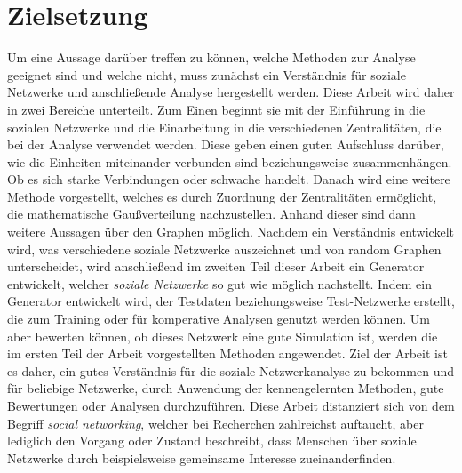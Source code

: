 \section{Zielsetzung}\label{sec:zielsetzung}
Um eine Aussage darüber treffen zu können, welche Methoden zur Analyse geeignet sind und welche nicht, muss zunächst ein Verständnis für soziale Netzwerke und anschließende Analyse hergestellt werden. Diese Arbeit wird daher in zwei Bereiche unterteilt. Zum Einen beginnt sie mit der Einführung in die sozialen Netzwerke und die Einarbeitung in die verschiedenen Zentralitäten, die bei der Analyse verwendet werden. Diese geben einen guten Aufschluss darüber, wie die Einheiten miteinander verbunden sind beziehungsweise zusammenhängen. Ob es sich starke Verbindungen oder schwache handelt. Danach wird eine weitere Methode vorgestellt, welches es durch Zuordnung der Zentralitäten ermöglicht, die mathematische Gaußverteilung nachzustellen. Anhand dieser sind dann weitere Aussagen über den Graphen möglich. Nachdem ein Verständnis entwickelt wird, was verschiedene soziale Netzwerke auszeichnet und von random Graphen unterscheidet, wird anschließend im zweiten Teil dieser Arbeit ein Generator entwickelt, welcher \textit{soziale Netzwerke} so gut wie möglich nachstellt. Indem ein Generator entwickelt wird, der Testdaten beziehungsweise Test-Netzwerke erstellt, die zum Training oder für komperative Analysen genutzt werden können. Um aber bewerten können, ob dieses Netzwerk eine gute Simulation ist, werden die im ersten Teil der Arbeit vorgestellten Methoden angewendet. Ziel der Arbeit ist es daher, ein gutes Verständnis für die soziale Netzwerkanalyse zu bekommen und für beliebige Netzwerke, durch Anwendung der kennengelernten Methoden, gute Bewertungen oder Analysen durchzuführen.
Diese Arbeit distanziert sich von dem Begriff \textit{social networking}, welcher bei Recherchen zahlreichst auftaucht, aber lediglich den Vorgang oder Zustand beschreibt, dass Menschen über soziale Netzwerke durch beispielsweise gemeinsame Interesse zueinanderfinden. 




